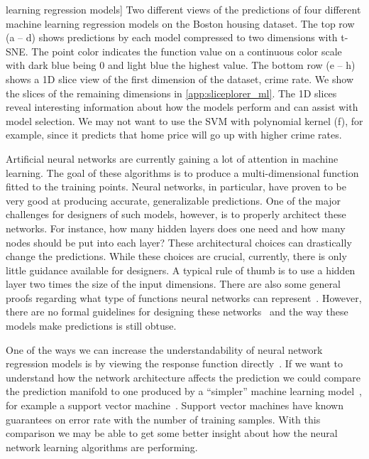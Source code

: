 \begin{figure*}[t]
           learning regression models]{%
    Two different views of the predictions of four different machine learning
    regression models on the Boston housing dataset. The top row (a -- d) shows
    predictions by each model compressed to two dimensions with t-SNE. The
    point color indicates the function value on a
    continuous color scale with dark blue being 0 and
    light blue the highest value. The bottom row (e -- h) shows a 1D slice view
    of the first dimension of the dataset, crime rate. We show the slices of
    the remaining dimensions in \autoref{app:sliceplorer_ml}.
    The 1D slices reveal interesting information about how the models perform and
    can assist with model selection. We may not want to use the SVM with
    polynomial kernel (f), for example, since it predicts that home price will go
    up with higher crime rates.
  }
  \label{fig:nn_comp}
\end{figure*}

Artificial neural networks are currently gaining a lot of attention in machine
learning.  The goal of these algorithms is to produce a multi-dimensional
function fitted to the training points. Neural networks, in particular, have
proven to be very good at producing accurate, generalizable predictions. One of
the major challenges for designers of such models, however, is to properly
architect these networks. For instance, how many hidden layers does one need
and how many nodes should be put into each layer? These architectural choices
can drastically change the predictions.
While these choices are crucial, currently, there is only
little guidance available for designers. A typical rule of thumb is to
use a hidden layer two times the size of the input dimensions.
There are also some general proofs regarding what type of functions neural
networks can represent~\cite{Hornik:1989,Eldan:2016}. However, there are no
formal guidelines for designing these networks~\cite{Goodfellow:2016} and the
way these models make predictions is still obtuse.

One of the ways we can increase the understandability of neural network
regression models is by viewing the response function
directly~\cite{Gleicher:2016}. If we want to understand how the network
architecture affects the prediction we could compare the prediction manifold to
one produced by a ``simpler'' machine learning model~\cite{Ribeiro:2016a}, for
example a support vector machine~\cite{Smola:2004}.  Support vector machines
have known guarantees on error rate with the number of training samples. With
this comparison we may be able to get some better insight about how the neural
network learning algorithms are performing.

